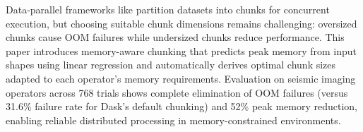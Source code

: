Data-parallel frameworks like \dask partition datasets into chunks for concurrent execution, but choosing suitable chunk dimensions remains challenging: oversized chunks cause \ac{OOM} failures while undersized chunks reduce performance.
This paper introduces memory-aware chunking that predicts peak memory from input shapes using linear regression and automatically derives optimal chunk sizes adapted to each operator's memory requirements.
Evaluation on seismic imaging operators across 768 trials shows complete elimination of \ac{OOM} failures (versus 31.6\% failure rate for Dask's default chunking) and 52\% peak memory reduction, enabling reliable distributed processing in memory-constrained environments.